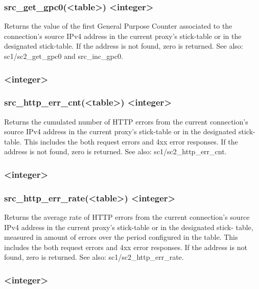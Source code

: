 \subsubsection*{src\_get\_gpc0(<table>) <integer>}

  Returns the value of the first General Purpose Counter associated to the
  connection's source IPv4 address in the current proxy's stick-table or in
  the designated stick-table. If the address is not found, zero is returned.
  See also: sc1/sc2\_get\_gpc0 and src\_inc\_gpc0.

\subsubsection[src\_http\_err\_cnt]{ <integer>}
\subsubsection*{src\_http\_err\_cnt(<table>) <integer>}

  Returns the cumulated number of HTTP errors from the current connection's
  source IPv4 address in the current proxy's stick-table or in the designated
  stick-table. This includes the both request errors and 4xx error responses.
  If the address is not found, zero is returned. See also: sc1/sc2\_http\_err\_cnt.

\subsubsection[src\_http\_err\_rate]{ <integer>}
\subsubsection*{src\_http\_err\_rate(<table>) <integer>}

  Returns the average rate of HTTP errors from the current connection's source
  IPv4 address in the current proxy's stick-table or in the designated stick-
  table, measured in amount of errors over the period configured in the table.
  This includes the both request errors and 4xx error responses. If the address
  is not found, zero is returned. See also: sc1/sc2\_http\_err\_rate.

\subsubsection[src\_http\_req\_cnt]{ <integer>}
